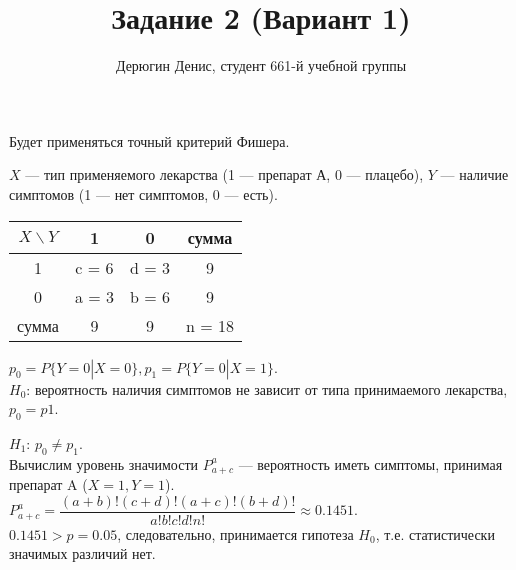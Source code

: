 \documentclass[20pt]{article}
\title{Задание 2 (Вариант 1)}
\author{
	Дерюгин Денис, студент 661-й учебной группы
}
\begin{document}
\large{
\maketitle
Будет применяться точный критерий Фишера.

$X$ --- тип применяемого лекарства (1 --- препарат А, 0 --- плацебо), $Y$ --- наличие симптомов (1 --- нет симптомов, 0 --- есть).

\begin{center}
    \begin{tabular}{ | c | c | c | c |}
        \hline
        $X \backslash Y$ & 1 & 0 & сумма \\ \hline
        1 & c = 6 & d = 3 & 9 \\ 
        0 & a = 3 & b = 6 & 9 \\ \hline
        сумма & 9 & 9 & n = 18\\ 
        \hline
    \end{tabular}
\end{center}

$p_0 = P\{Y = 0 | X= 0 \}, p_1 = P\{Y=0 | X=1\}$.  \\

$H_0$: вероятность наличия симптомов не зависит от типа принимаемого лекарства, $p_0=p1$.

$H_1$: $p_0 \neq p_1$. \\

Вычислим уровень значимости $P_{a+c}^a$ --- вероятность иметь симптомы, принимая препарат A ($X=1, Y=1$). \\


$P_{a+c}^a = \dfrac{(a+b)!(c+d)!(a+c)!(b+d)!}{a!b!c!d!n!} \approx 0.1451$. \\

$0.1451 > p = 0.05$, следовательно, принимается гипотеза $H_0$, т.е. статистически значимых различий нет.

}
\end{document}
